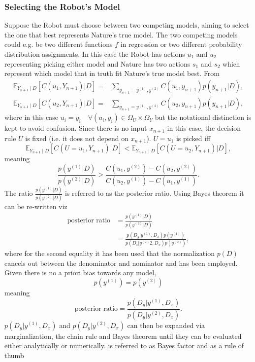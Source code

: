 \subsubsection{Selecting the Robot's Model}
\label{sec:model_selection}
Suppose the Robot must choose between two competing models, aiming to select the one that best represents Nature's true model. The two competing models could e.g. be two different functions $f$ in regression or two different probability distribution assignments. In this case the Robot has actions $u_1$ and $u_2$ representing picking either model and Nature has two actions $s_1$ and $s_2$ which represent which model that in truth fit Nature's true model best. From 
\begin{equation}
	\begin{split}
		\mathbb{E}_{Y_{n+1}\mid D}[C(u_1, Y_{n+1})|D] =&  \sum_{y_{n+1} = y^{(1)},y^{(2)}}C(u_1,y_{n+1})p(y_{n+1}|D),\\
		\mathbb{E}_{Y_{n+1}\mid D}[C(u_2, Y_{n+1})|D] =&  \sum_{y_{n+1} = y^{(1)},y^{(2)}}C(u_2,y_{n+1})p(y_{n+1}|D),
	\end{split}
\end{equation}
where in this case $u_i=y_i\quad \forall (u_i,y_i)\in \Omega_U\times\Omega_Y$ but the notational distinction is kept to avoid confusion. Since there is no input $x_{n+1}$ in this case, the decision rule $U$ is fixed (i.e. it does not depend on $x_{n+1}$). $U = u_1$ is picked iff 
\begin{equation}
	\mathbb{E}_{Y_{n+1}\mid D}[C(U = u_1, Y_{n+1})|D]<\mathbb{E}_{Y_{n+1}\mid D}[C(U = u_2, Y_{n+1})|D],
\end{equation}
meaning
\begin{equation}
	\frac{p(y^{(1)}|D)}{p(y^{(2)}|D)}>\frac{C(u_1,y^{(2)})-C(u_2,y^{(2)})}{C(u_2,y^{(1)})-C(u_1,y^{(1)})}.
\end{equation}
The ratio $\frac{p(y^{(1)}|D)}{p(y^{(2)}|D)}$ is referred to as the posterior ratio. Using Bayes theorem it can be re-written viz
\begin{equation}
	\begin{split}
		\text{posterior ratio} &= \frac{p(y^{(1)}|D)}{p(y^{(2)}|D)}\\
		& = \frac{p(D_y|y^{(1)},D_x)p(y^{(1)})}{p(D_s|y^{(2)}2,D_x)p(y^{(2)})},
	\end{split}
\end{equation}
where for the second equality it has been used that the normalization $p(D)$ cancels out between the denominator and nominator and  has been employed. Given there is no a priori bias towards any model,
\begin{equation}
	p(y^{(1)}) = p(y^{(2)})
\end{equation}
meaning
\begin{equation}
	\text{posterior ratio} = \frac{p(D_y|y^{(1)},D_x)}{p(D_y|y^{(2)},D_x)}.
	\label{eq:bayes_factor}
\end{equation}
$p(D_y|y^{(1)},D_x)$ and $p(D_y|y^{(2)},D_x)$ can then be expanded via marginalization, the chain rule and Bayes theorem until they can be evaluated either analytically or numerically.  is referred to as Bayes factor and as a rule of thumb

